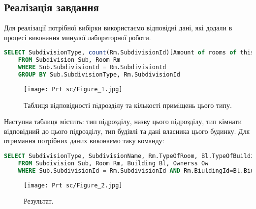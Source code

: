 \documentclass[a4paper,12pt]{article}
\begin{document}
\newpage
	\begin{center}
		\section*{\bfseries{Реалізація завдання}}
	\end{center}

    Для реалізації потрібної вибірки використаємо відповідні дані, 
    які додали в процесі виконання минулої лабораторної роботи. \\
    \begin{lstlisting}[language=SQL]
    SELECT SubdivisionType, count(Rm.SubdivisionId)[Amount of rooms of this type]
    FROM Subdivision Sub, Room Rm
    WHERE Sub.SubdivisionId = Rm.SubdivisionId
    GROUP BY Sub.SubdivisionType, Rm.SubdivisionId
    \end{lstlisting}
    \begin{figure}[h!]
		\begin{minipage}[h]{1\linewidth}
            \centering
			\texttt{[image: Prt sc/Figure\_1.jpg]}  
		\end{minipage}
		\caption{Таблиця відповідності пiдроздiлу та кількості примiщень цього типу.}
	\end{figure}

    Наступна таблиця містить: тип підрозділу, назву цього підрозділу, тип кімнати відповідний
    до цього підрозділу, тип будівлі та дані власника цього будинку. Для отримання потрібних
    даних виконаємо таку команду:
    \begin{lstlisting}[language=SQL]
    SELECT SubdivisionType, SubdivisionName, Rm.TypeOfRoom, Bl.TypeOfBuilding, Ow.FirstName, Ow.LastName
    FROM Subdivision Sub, Room Rm, Building Bl, Ownerss Ow
    WHERE Sub.SubdivisionId = Rm.SubdivisionId AND Rm.BiuldingId=Bl.BiuldingId AND Bl.IdOwner=Ow.OwnerId
    \end{lstlisting}

\newpage
    \begin{figure}[h!]
		\begin{minipage}[h]{1\linewidth}
            \centering
			\texttt{[image: Prt sc/Figure\_2.jpg]}  
		\end{minipage}
		\caption{Результат.}
	\end{figure}
\end{document}
